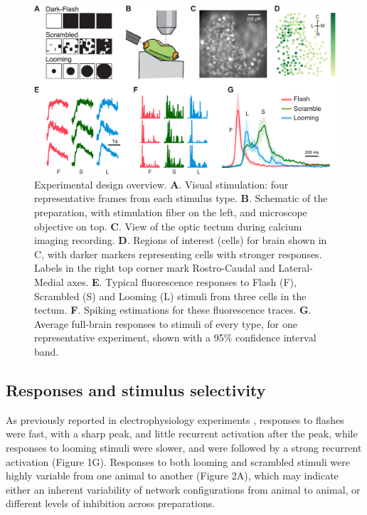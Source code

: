 \documentclass{article}
\begin{document}
\begin{figure}[t!]
\includegraphics[width=\linewidth]{fig1.pdf}
\caption{
Experimental design overview. \textbf{A}. Visual stimulation: four representative frames from each stimulus type. \textbf{B}. Schematic of the preparation, with stimulation fiber on the left, and microscope objective on top. \textbf{C}. View of the optic tectum during calcium imaging recording. \textbf{D}. Regions of interest (cells) for brain shown in C, with darker markers representing cells with stronger responses. Labels in the right top corner mark Rostro-Caudal and Lateral-Medial axes. \textbf{E}. Typical fluorescence responses to Flash (F), Scrambled (S) and Looming (L) stimuli from three cells in the tectum. \textbf{F}. Spiking estimations for these fluorescence traces. \textbf{G}. Average full-brain responses to stimuli of every type, for one representative experiment, shown with a 95\% confidence interval band. }
\end{figure}

\subsection*{Responses and stimulus selectivity}

As previously reported in electrophysiology experiments \citep{khakhalin2014}, responses to flashes were fast, with a sharp peak, and little recurrent activation after the peak, while responses to looming stimuli were slower, and were followed by a strong recurrent activation (Figure 1G). Responses to both looming and scrambled stimuli were highly variable from one animal to another (Figure 2A), which may indicate either an inherent variability of network configurations from animal to animal, or different levels of inhibition across preparations. %
\end{document}
